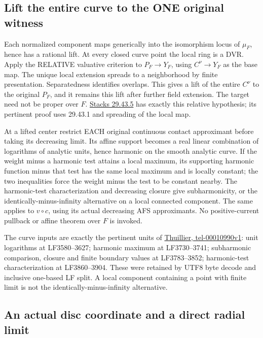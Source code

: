 \documentclass[
  10pt,
]{article}
\begin{document}
\subsection{Lift the entire curve to the ONE original
witness}\label{lift-the-entire-curve-to-the-one-original-witness}

Each normalized component maps generically into the isomorphism locus of
\(\mu_F\), hence has a rational lift. At every closed curve point the
local ring is a DVR. Apply the RELATIVE valuative criterion to
\(P_F\to Y_F\), using \(C^\nu\to Y_F\) as the base map. The unique local
extension spreads to a neighborhood by finite presentation.
Separatedness identifies overlaps. This gives a lift of the entire
\(C^\nu\) to the original \(P_F\), and it remains this lift after
further field extension. The target need not be proper over \(F\).
\href{https://stacks.math.columbia.edu/tag/0BX4}{Stacks 29.43.5} has
exactly this relative hypothesis; its pertinent proof uses 29.43.1 and
spreading of the local map.

At a lifted center restrict EACH original continuous contact approximant
before taking its decreasing limit. Its affine support becomes a real
linear combination of logarithms of analytic units, hence harmonic on
the smooth analytic curve. If the weight minus a harmonic test attains a
local maximum, its supporting harmonic function minus that test has the
same local maximum and is locally constant; the two inequalities force
the weight minus the test to be constant nearby. The harmonic-test
characterization and decreasing closure give subharmonicity, or the
identically-minus-infinity alternative on a local connected component.
The same applies to \(v\circ c\), using its actual decreasing AFS
approximants. No positive-current pullback or affine theorem over \(F\)
is invoked.

The curve inputs are exactly the pertinent units of
\href{https://theses.hal.science/tel-00010990v1/document}{Thuillier,
tel-00010990v1}: unit logarithms at LF3580--3627; harmonic maximum at
LF3730--3741; subharmonic comparison, closure and finite boundary values
at LF3783--3852; harmonic-test characterization at LF3860--3904. These
were retained by UTF8 byte decode and inclusive one-based LF split. A
local component containing a point with finite limit is not the
identically-minus-infinity alternative.

\subsection{An actual disc coordinate and a direct radial
limit}\label{an-actual-disc-coordinate-and-a-direct-radial-limit}
\end{document}

